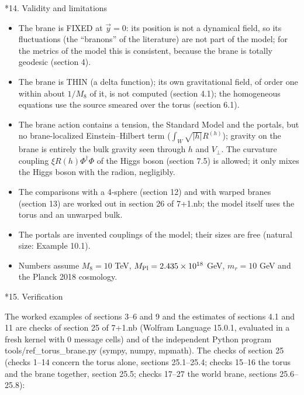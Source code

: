 \documentclass[10pt,a4paper]{article}
\makeatletter
\renewcommand\section{\@startsection{section}{1}{\z@}{-3.5ex \@plus -1ex \@minus -.2ex}{2.3ex \@plus.2ex}{\normalfont\Large\bfseries\raggedright}}
\makeatother
\begin{document}
\section*{14. Validity and limitations}
\begin{itemize}
\item The brane is FIXED at $\vec y=0$: its position is not a dynamical field, so its fluctuations (the “branons” of the literature) are not part of the model; for the metrics of the model this is consistent, because the brane is totally geodesic (section 4).
\item The brane is THIN (a delta function); its own gravitational field, of order one within about $1/M_8$ of it, is not computed (section 4.1); the homogeneous equations use the source smeared over the torus (section 6.1).
\item The brane action contains a tension, the Standard Model and the portals, but no brane-localized Einstein–Hilbert term ($\int_W\sqrt{|h|}R^{(h)}$); gravity on the brane is entirely the bulk gravity seen through $h$ and $V_\perp$. The curvature coupling $\xi R(h)\Phi^\dagger\Phi$ of the Higgs boson (section 7.5) is allowed; it only mixes the Higgs boson with the radion, negligibly.
\item The comparisons with a 4-sphere (section 12) and with warped branes (section 13) are worked out in section 26 of 7+1.nb; the model itself uses the torus and an unwarped bulk.
\item The portals are invented couplings of the model; their sizes are free (natural size: Example 10.1).
\item Numbers assume $M_8=10$ TeV, $M_{\rm Pl}=2.435\times10^{18}$ GeV, $m_r=10$ GeV and the Planck 2018 cosmology.
\end{itemize}
\section*{15. Verification}
The worked examples of sections 3–6 and 9 and the estimates of sections 4.1 and 11 are checks of section 25 of 7+1.nb (Wolfram Language 15.0.1, evaluated in a fresh kernel with 0 message cells) and of the independent Python program tools/ref\_torus\_brane.py (sympy, numpy, mpmath). The checks of section 25 (checks 1–14 concern the torus alone, sections 25.1–25.4; checks 15–16 the torus and the brane together, section 25.5; checks 17–27 the world brane, sections 25.6–25.8):
\end{document}
